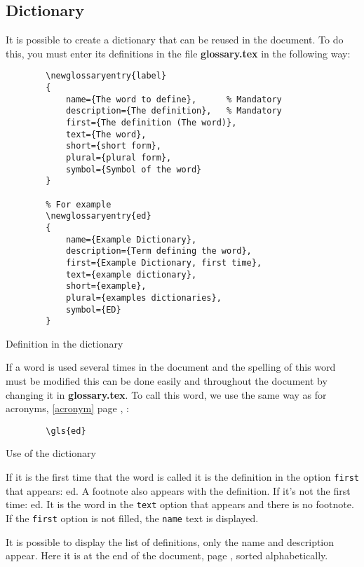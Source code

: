 \subsection{Dictionary} \label{dictionary}
It is possible to create a dictionary that can be reused in the document.
To do this, you must enter its definitions in the file \textbf{glossary.tex} in the following way:
\begin{code}
    \begin{verbatim}
        \newglossaryentry{label}
        {
            name={The word to define},      % Mandatory
            description={The definition},   % Mandatory
            first={The definition (The word)},
            text={The word},
            short={short form},
            plural={plural form},
            symbol={Symbol of the word}
        }

        % For example
        \newglossaryentry{ed}
        {
            name={Example Dictionary},
            description={Term defining the word},
            first={Example Dictionary, first time},
            text={example dictionary},
            short={example},
            plural={examples dictionaries},
            symbol={ED}
        }
\end{verbatim}
    \caption{Definition in the dictionary}
\end{code}

If a word is used several times in the document and the spelling of this word must be modified
this can be done easily and throughout the document by changing it in \textbf{glossary.tex}.
To call this word, we use the same way as for acronyms, \ref{acronym} page \pageref{acronym}, :
\begin{code}
    \begin{verbatim}
        \gls{ed}
\end{verbatim}
    \caption{Use of the dictionary}
\end{code}

If it is the first time that the word is called it is the definition in the option
\texttt{first} that appears: \gls{ed}. A footnote also appears with the definition.
\newline
If it's not the first time: \gls{ed}. It is the word in the \texttt{text} option that
appears and there is no footnote.
If the \texttt{first} option is not filled, the \texttt{name} text is
displayed.

It is possible to display the list of definitions, only the name and description appear. Here it is
at the end of the document, page \pageref{domaindictionary}, sorted alphabetically.


